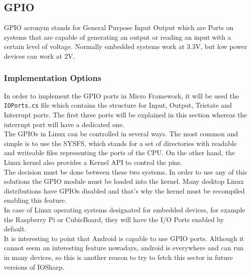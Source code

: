 \subsection{GPIO}\label{SS:GPIO}
GPIO acronym stands for General Purpose Input Output which are Ports on systems that are capable of generating an output or reading an input with a certain level of voltage. Normally embedded systems work at 3.3V, but low power devices can work at 2V.

\subsubsection{Implementation Options}\label{SSS:Implementation-Options}
In order to implement the GPIO ports in Micro Framework, it will be used the \verb!IOPorts.cs! file which contains the structure for Input, Output, Tristate and Interrupt ports. The first three ports will be explained in this section whereas the interrupt port will have a dedicated one.
\\
The GPIOs in Linux can be controlled in several ways. The most common and simple is to use the \gls{SYSFS}, which stands for a set of directories with readable and writeable files representing the ports of the CPU. On the other hand, the Linux kernel also provides a Kernel API to control the pins.
\\
The decision must be done between these two systems. In order to use any of this solutions the GPIO module must be loaded into the kernel. Many desktop Linux distributions have GPIOs disabled and that's why the kernel must be recompiled enabling this feature.
\\
In case of Linux operating systems designated for embedded devices, for example the Raspberry Pi or CubieBoard, they will have the I/O Ports enabled by default.
\\
It is interesting to point that Android is capable to use GPIO ports. Although it cannot seem an interesting feature nowadays, android is everywhere and can run in many devices, so this is another reason to try to fetch this sector in future versions of IOSharp.

